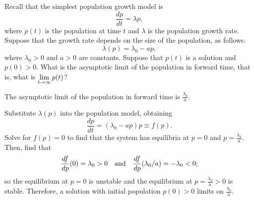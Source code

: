 \documentclass{ximera}
\begin{document}
\begin{exercise} \label{E:popex}
Recall that the simplest population growth model
 is 
\[
\frac{dp}{dt} = \lambda p,
\]
where $p(t)$ is the population at time $t$ and $\lambda$ is the
population growth rate. Suppose that the growth rate depends on
the size of the population, as follows:
\[
\lambda(p) = \lambda_0 - ap,
\]
where $\lambda_0>0$ and $a>0$ are constants.  Suppose that
$p(t)$ is a solution and $p(0)>0$.  What is the asymptotic
limit of the population in forward time, that is, what is
$\displaystyle\lim_{t\to\infty} p(t)$?

\begin{solution}

\ans The asymptotic limit of the population in forward time is
$\frac{\lambda_0}{a}$.

\soln Substitute $\lambda(p)$ into the population model, obtaining
\[
\frac{dp}{dt} = (\lambda_0 - ap)p\equiv f(p).
\]
Solve for $f(p)= 0$ to find that the system has equilibria
at $p = 0$ and $p = \frac{\lambda_0}{a}$.  Then, find that
\[
\frac{df}{dp}(0) = \lambda_0 > 0 \quad\mbox{and}\quad
\frac{df}{dp}(\lambda_0/a) = -\lambda_0 < 0;
\]
so the equilibrium at $p = 0$ is unstable and the equilibrium at
$p = \frac{\lambda_0}{a} > 0$ is stable.  Therefore, a solution with 
initial population $p(0) > 0$ limits on $\frac{\lambda_0}{a}$.

\end{solution}
\end{exercise}  
\end{document}
